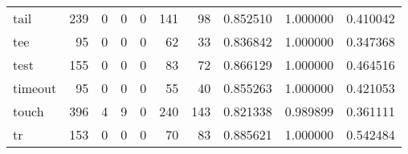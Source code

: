 \begin{longtable}{lrrrrrrrrr}
tail      &                                   239 &                                                  0 &                                                  0 &                                                  0 &                                                141 &                                                 98 &                                           0.852510 &                               1.000000 &                             0.410042 \\
tee       &                                    95 &                                                  0 &                                                  0 &                                                  0 &                                                 62 &                                                 33 &                                           0.836842 &                               1.000000 &                             0.347368 \\
test      &                                   155 &                                                  0 &                                                  0 &                                                  0 &                                                 83 &                                                 72 &                                           0.866129 &                               1.000000 &                             0.464516 \\
timeout   &                                    95 &                                                  0 &                                                  0 &                                                  0 &                                                 55 &                                                 40 &                                           0.855263 &                               1.000000 &                             0.421053 \\
touch     &                                   396 &                                                  4 &                                                  9 &                                                  0 &                                                240 &                                                143 &                                           0.821338 &                               0.989899 &                             0.361111 \\
tr        &                                   153 &                                                  0 &                                                  0 &                                                  0 &                                                 70 &                                                 83 &                                           0.885621 &                               1.000000 &                             0.542484 \\

\end{longtable}
